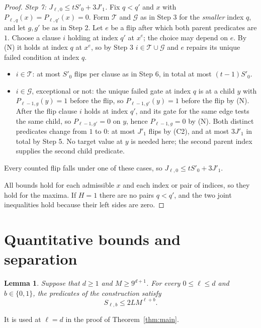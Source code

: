 \documentclass[11pt]{article}
\newtheorem{lemma}[theorem]{Lemma}
\theoremstyle{definition}
\theoremstyle{remark}
\begin{document}
\begin{proof}
\emph{Step 7: $J_{\ell,0}\le tS'_0+3J'_1$.}
Fix $q<q'$ and $x$ with $P_{\ell,q}(x)=P_{\ell,q'}(x)=0$. Form $\mathcal T$
and $\mathcal G$ as in Step 3 for the \emph{smaller} index $q$, and let
$g,g'$ be as in Step 2. Let $e$ be a flip after which both parent predicates
are $1$. Choose a clause $i$ holding at index $q'$ at $x^e$; the choice may
depend on $e$. By (N) it holds at index $q$ at $x^e$, so by Step 3
$i\in\mathcal T\cup\mathcal G$ and $e$ repairs its unique failed condition at
index $q$.
\begin{itemize}[nosep]
\item $i\in\mathcal T$: at most $S'_0$ flips per clause as in Step 6, in
total at most $(t-1)S'_0$.
\item $i\in\mathcal G$, exceptional or not: the unique failed gate at index
$q$ is at a child $y$ with $P_{\ell-1,g}(y)=1$ before the flip, so
$P_{\ell-1,g'}(y)=1$ before the flip by (N). After the flip clause $i$ holds
at index $q'$, and its gate for the same edge tests the same child, so
$P_{\ell-1,g'}=0$ on $y$, hence $P_{\ell-1,g}=0$ by (N). Both distinct
predicates change from $1$ to $0$: at most $J'_1$ flips by (C2), and at most
$3J'_1$ in total by Step 5. No target value at $y$ is needed here; the second
parent index supplies the second child predicate.
\end{itemize}
Every counted flip falls under one of these cases, so
$J_{\ell,0}\le tS'_0+3J'_1$.

All bounds hold for each admissible $x$ and each index or pair of indices, so
they hold for the maxima. If $H=1$ there are no pairs $q<q'$, and the two
joint inequalities hold because their left sides are zero.
\end{proof}

\section{Quantitative bounds and separation}
\label{sec:separation}

\begin{lemma}
\label{lem:quantitative-profiles}
Suppose that $d\geq 1$ and $M\geq 9^{d+1}$.
For every $0\leq\ell\leq d$ and $b\in\{0,1\}$, the predicates of the
construction satisfy
\[
  S_{\ell,b}\leq 2L M^{\ell+b}.
\]
\end{lemma}
It is used at $\ell=d$ in the proof of Theorem~\ref{thm:main}.
\end{document}
